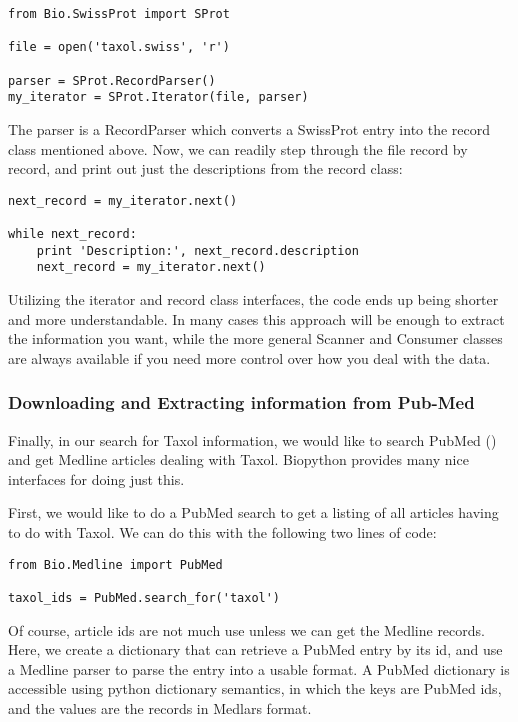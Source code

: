 \documentclass[dvips]{article}
\begin{document}
\begin{verbatim}
from Bio.SwissProt import SProt

file = open('taxol.swiss', 'r')

parser = SProt.RecordParser()
my_iterator = SProt.Iterator(file, parser)
\end{verbatim}


The parser is a RecordParser which converts a SwissProt entry into the record class mentioned above. Now, we can readily step through the file record by record, and print out just the descriptions from the record class:

\begin{verbatim}
next_record = my_iterator.next()

while next_record:
    print 'Description:', next_record.description
    next_record = my_iterator.next()
\end{verbatim}

Utilizing the iterator and record class interfaces, the code ends up being shorter and more understandable. In many cases this approach will be enough to extract the information you want, while the more general Scanner and Consumer classes are always available if you need more control over how you deal with the data.


\subsubsection{Downloading and Extracting information from Pub-Med}

Finally, in our search for Taxol information, we would like to search PubMed () and get Medline articles dealing with Taxol. Biopython provides many nice interfaces for doing just this.


First, we would like to do a PubMed search to get a listing of all articles having to do with Taxol. We can do this with the following two lines of code:

\begin{verbatim}
from Bio.Medline import PubMed

taxol_ids = PubMed.search_for('taxol')
\end{verbatim}


Of course, article ids are not much use unless we can get the Medline records. Here, we create a dictionary that can retrieve a PubMed entry by its id, and use a Medline parser to parse the entry into a usable format. A PubMed dictionary is accessible using python dictionary semantics, in which the keys are PubMed ids, and the values are the records in Medlars format.
\end{document}

